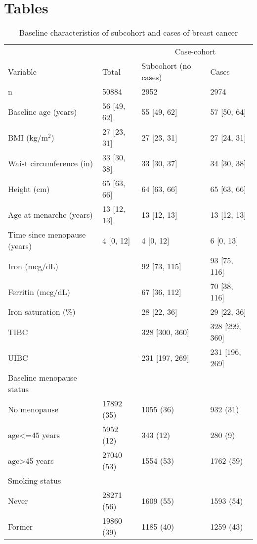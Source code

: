 \documentclass[
]{article}
\date{}
\begin{document}
\singlespace

\hypertarget{tables}{%
\section{Tables}\label{tables}}

\begin{longtable}[t]{llll}
\caption{\label{tab:unnamed-chunk-4}Baseline characteristics of subcohort and cases of breast cancer}\\
\toprule
\multicolumn{2}{c}{ } & \multicolumn{2}{c}{Case-cohort} \\
\cmidrule(l{3pt}r{3pt}){3-4}
Variable & Total & Subcohort (no cases) & Cases\\
\midrule
n & 50884 & 2952 & 2974\\
Baseline age (years) & 56 [49, 62] & 55 [49, 62] & 57 [50, 64]\\
BMI (kg/m$^2$) & 27 [23, 31] & 27 [23, 31] & 27 [24, 31]\\
Waist circumference (in) & 33 [30, 38] & 33 [30, 37] & 34 [30, 38]\\
Height (cm) & 65 [63, 66] & 64 [63, 66] & 65 [63, 66]\\
Age at menarche (years) & 13 [12, 13] & 13 [12, 13] & 13 [12, 13]\\
Time since menopause (years) & 4 [0, 12] & 4 [0, 12] & 6 [0, 13]\\
Iron (mcg/dL) &  & 92 [73, 115] & 93 [75, 116]\\
Ferritin (mcg/dL) &  & 67 [36, 112] & 70 [38, 116]\\
Iron saturation (\%) &  & 28 [22, 36] & 29 [22, 36]\\
TIBC &  & 328 [300, 360] & 328 [299, 360]\\
UIBC &  & 231 [197, 269] & 231 [196, 269]\\
Baseline menopause status &  &  & \\
\hspace{1em}No menopause & 17892 (35) & 1055 (36) & 932 (31)\\
\hspace{1em}age<=45 years & 5952 (12) & 343 (12) & 280 (9)\\
\hspace{1em}age>45 years & 27040 (53) & 1554 (53) & 1762 (59)\\
Smoking status &  &  & \\
\hspace{1em}Never & 28271 (56) & 1609 (55) & 1593 (54)\\
\hspace{1em}Former & 19860 (39) & 1185 (40) & 1259 (43)\\

\end{longtable}
\end{document}
